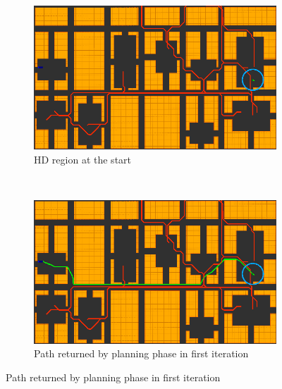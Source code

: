 \begin{figure}[ht]
  \centering
  \begin{subfigure}[t]{0.45\linewidth}
    \centering
    \includegraphics[width=\linewidth]{Figures/alg1_c.png}
    \caption{HD region at the start}
  \end{subfigure}
  ~
  \begin{subfigure}[t]{0.45\linewidth}
    \centering
    \includegraphics[width=\linewidth]{Figures/alg2_c.png}
    \caption{Path returned by planning phase in first iteration}
  \end{subfigure}


\end{figure}
